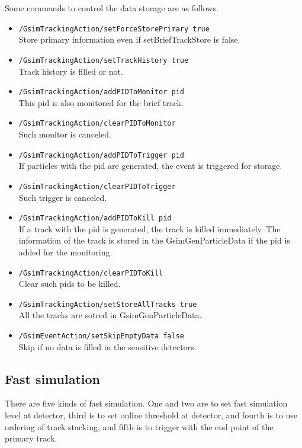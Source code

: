 \documentclass[a4paper,12pt]{article}
\begin{document}
  Some commands to control the data storage are as follows.
  \begin{itemize}
   \item {\tt /GsimTrackingAction/setForceStorePrimary true}\\
	 Store primary information even if setBriefTrackStore is false.
   \item {\tt /GsimTrackingAction/setTrackHistory true}\\
	 Track history is filled or not.
   \item {\tt /GsimTrackingAction/addPIDToMonitor pid}\\
	 This pid is also monitored for the brief track.
   \item {\tt /GsimTrackingAction/clearPIDToMonitor}\\
	 Such monitor is canceled.
   \item {\tt /GsimTrackingAction/addPIDToTrigger pid}\\
	 If particles with the pid are generated,
	 the event is triggered for storage.
   \item {\tt /GsimTrackingAction/clearPIDToTrigger}\\
	 Such trigger is canceled.
   \item {\tt /GsimTrackingAction/addPIDToKill pid}\\
	 If a track with the pid is generated,
	 the track is killed immediately. The information of the track
	 is stored in the GsimGenParticleData if the pid is added for 
	 the monitoring.
   \item {\tt /GsimTrackingAction/clearPIDToKill}\\
	 Clear such pids to be killed.
   \item {\tt /GsimTrackingAction/setStoreAllTracks true}\\
	 All the tracks are sotred in GsimGenParticleData.
   \item {\tt /GsimEventAction/setSkipEmptyData false}\\
	 Skip if no data is filled in the sensitive detectors.
  \end{itemize}
  
 \subsection{Fast simulation}
 There are five kinds of fast simulation.
 One and two are to set fast simulation level at detector,
 third is to set
 online threshold at detector, and fourth is to use 
 ordering of  track stacking, and fifth is   
 to trigger with the end point of the primary track.
\end{document}
